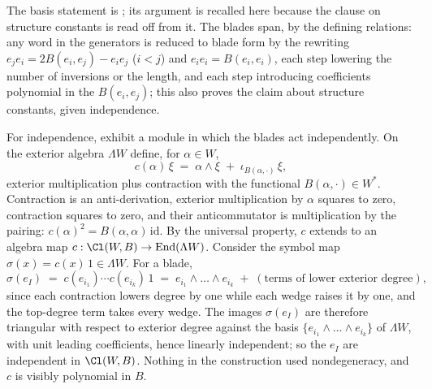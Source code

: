 The basis statement is ; its argument is recalled here because the clause on structure constants is read off from it. The blades span, by the defining relations: any word in the generators is reduced to blade form by the rewriting $e_j e_i = 2B(e_i, e_j) - e_i e_j$ ($i < j$) and $e_i e_i = B(e_i, e_i)$, each step lowering the number of inversions or the length, and each step introducing coefficients polynomial in the $B(e_i,e_j)$; this also proves the claim about structure constants, given independence.

For independence, exhibit a module in which the blades act independently. On the exterior algebra $\Lambda W$ define, for $\alpha \in W$,
\[
c(\alpha)\,\xi \;=\; \alpha \wedge \xi \;+\; \iota_{B(\alpha, \cdot)}\,\xi ,
\]
exterior multiplication plus contraction with the functional $B(\alpha, \cdot) \in W^*$. Contraction is an anti-derivation, exterior multiplication by $\alpha$ squares to zero, contraction squares to zero, and their anticommutator is multiplication by the pairing: $c(\alpha)^2 = B(\alpha,\alpha)\,\mathrm{id}$. By the universal property, $c$ extends to an algebra map $c : \Cl(W,B) \to \mathrm{End}(\Lambda W)$. Consider the symbol map $\sigma(x) = c(x)\,1 \in \Lambda W$. For a blade,
\[
\sigma(e_I) \;=\; c(e_{i_1}) \cdots c(e_{i_k})\,1 \;=\; e_{i_1} \wedge \dots \wedge e_{i_k} \;+\; (\text{terms of lower exterior degree}),
\]
since each contraction lowers degree by one while each wedge raises it by one, and the top-degree term takes every wedge. The images $\sigma(e_I)$ are therefore triangular with respect to exterior degree against the basis $\{e_{i_1} \wedge \dots \wedge e_{i_k}\}$ of $\Lambda W$, with unit leading coefficients, hence linearly independent; so the $e_I$ are independent in $\Cl(W,B)$. Nothing in the construction used nondegeneracy, and $c$ is visibly polynomial in $B$.
